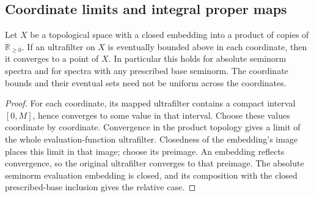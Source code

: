 \subsection{Coordinate limits and integral proper maps}
\label{subsec:spectrum-filters}

\begin{lemma}
\label{spectrum:closed-coordinate-ultrafilter-limit}
\leanok
{}
Let $X$ be a topological space with a closed embedding into a product
of copies of $\mathbb R_{\ge0}$. If an ultrafilter on $X$ is eventually
bounded above in each coordinate, then it converges to a point of $X$.
In particular this holds for absolute seminorm spectra and for spectra
with any prescribed base seminorm. The coordinate bounds and their
eventual sets need not be uniform across the coordinates.
\end{lemma}
\begin{proof}
For each coordinate, its mapped ultrafilter contains a compact interval
$[0,M]$, hence converges to some value in that interval. Choose these
values coordinate by coordinate. Convergence in the product topology
gives a limit of the whole evaluation-function ultrafilter. Closedness
of the embedding's image places this limit in that image; choose its
preimage. An embedding reflects convergence, so the original ultrafilter
converges to that preimage. The absolute seminorm evaluation embedding
is closed, and its composition with the closed prescribed-base inclusion
gives the relative case.
\end{proof}

